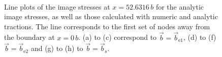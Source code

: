 \documentclass[11pt]{iopart}
\begin{document}
\begin{figure}
    ~
    \caption{Line plots of the image stresses at $x = 52.6316\, b$ for the analytic image stresses, as well as those calculated with numeric and analytic tractions. The line corresponds to the first set of nodes away from the boundary at $x = 0\, b$. (a) to (c) correspond to $\vec{b} = \vec{b}_{\textrm{e1}}$, (d) to (f) $\vec{b} = \vec{b}_{\textrm{e2}}$ and (g) to (h) to $\vec{b} = \vec{b}_{\textrm{s}}$.}
    \label{f:line_head_vs_ana_vs_num}
\end{figure}
\end{document}
